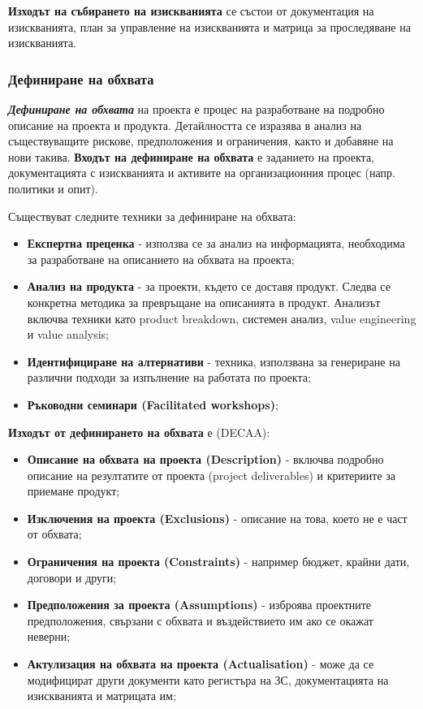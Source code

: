 \documentclass[fleqn,12pt]{article}
\begin{document}
\textbf{Изходът на събирането на изискванията} се състои от документация на изискванията, план за управление на изискванията и матрица за проследяване на изискванията.

\subsubsection{Дефиниране на обхвата}

\textbf{\textit{Дефиниране на обхвата}} на проекта е процес на разработване на подробно описание на проекта и продукта.
Детайлността се изразява в анализ на съществуващите рискове, предположения и ограничения, както и добавяне на нови такива.
\bigbreak
\textbf{Входът на дефиниране на обхвата} е заданието на проекта, документацията с изискванията и активите на организационния процес (напр. политики и опит).
\bigbreak

Съществуват следните техники за дефиниране на обхвата:
\begin{itemize}
    \item \textbf{Експертна преценка} - използва се за анализ на информацията, необходима за разработване на описанието на обхвата на проекта;
    \item \textbf{Анализ на продукта} - за проекти, където се доставя продукт.
    Следва се конкретна методика за превръщане на описанията в продукт.
    Анализът включва техники като product breakdown, системен анализ, value engineering  и value analysis;
    \item \textbf{Идентифициране на алтернативи} - техника, използвана за генериране на различни подходи за изпълнение на работата по проекта;
    \item \textbf{Ръководни семинари (Facilitated workshops)};
\end{itemize}

\textbf{Изходът от дефинирането на обхвата} е (DECAA):
\begin{itemize}
    \item \textbf{Описание на обхвата на проекта (Description)} - включва подробно описание на резултатите от проекта (project deliverables) и критериите за приемане продукт;
    \item \textbf{Изключения на проекта (Exclusions)} - описание на това, което не е част от обхвата;
    \item \textbf{Ограничения на проекта (Constraints)} - например бюджет, крайни дати, договори и други;
    \item \textbf{Предположения за проекта (Assumptions)} - изброява проектните предположения, свързани с обхвата и въздействието им ако се окажат неверни;
    \item \textbf{Актулизация на обхвата на проекта (Actualisation)} - може да се модифицират други документи като регистъра на ЗС, документацията на изискванията и матрицата им;
\end{itemize}
\end{document}
